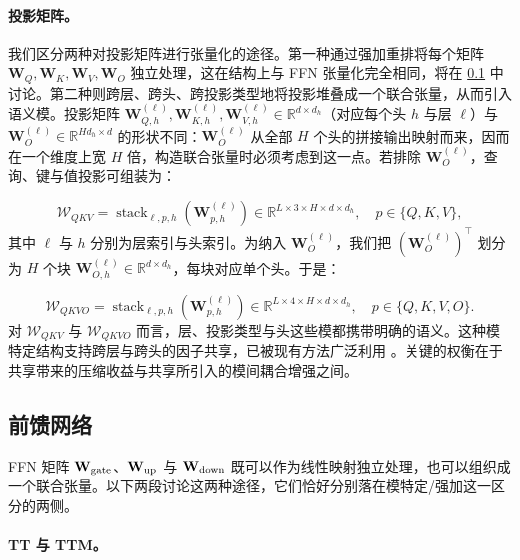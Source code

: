 \documentclass[11pt]{article}
\newcommand{\R}{\mathbb{R}}
\newcommand{\ten}[1]{\mathcal{#1}}
\newcommand{\mat}[1]{\mathbf{#1}}
\begin{document}
\paragraph{投影矩阵。}
我们区分两种对投影矩阵进行张量化的途径。第一种通过强加重排将每个矩阵 $\mat{W}_Q, \mat{W}_K, \mat{W}_V, \mat{W}_O$ 独立处理，这在结构上与 FFN 张量化完全相同，将在 \cref{sec:component-ffn} 中讨论。第二种则跨层、跨头、跨投影类型地将投影堆叠成一个联合张量，从而引入语义模。投影矩阵 $\mat{W}_{Q, h}^{(\ell)}, \mat{W}_{K, h}^{(\ell)}, \mat{W}_{V, h}^{(\ell)} \in\R^{d\times d_h}$（对应每个头 $h$ 与层 $\ell$）与 $\mat{W}_{O}^{(\ell)} \in\R^{Hd_h\times d}$ 的形状不同：$\mat{W}_{O}^{(\ell)}$ 从全部 $H$ 个头的拼接输出映射而来，因而在一个维度上宽 $H$ 倍，构造联合张量时必须考虑到这一点。若排除 $\mat{W}_{O}^{(\ell)}$，查询、键与值投影可组装为：

\begin{equation}
\label{eq:WQKV}
\ten{W}_{QKV} = \operatorname{stack}_{\ell,p,h}\!\left(\mat{W}_{p,h}^{(\ell)}\right) \in\R^{L\times 3\times H\times d\times d_h},
\quad p\in\{Q,K,V\},
\end{equation}
其中 $\ell$ 与 $h$ 分别为层索引与头索引。为纳入 $\mat{W}_{O}^{(\ell)}$，我们把 $(\mat{W}_{O}^{(\ell)})^\top$ 划分为 $H$ 个块 $\mat{W}_{O,h}^{(\ell)} \in\R^{d\times d_h}$，每块对应单个头。于是：

\begin{equation}
\label{eq:QKVO}
\ten{W}_{QKVO} = \operatorname{stack}_{\ell,p,h}\!\left(\mat{W}_{p,h}^{(\ell)}\right) \in\R^{L\times 4 \times H \times d \times d_h},
\quad p\in\{Q,K,V,O\}.
\end{equation}
对 $\ten{W}_{QKV}$ 与 $\ten{W}_{QKVO}$ 而言，层、投影类型与头这些模都携带明确的语义。这种模特定结构支持跨层与跨头的因子共享，已被现有方法广泛利用 \cite{li2026lestd}。关键的权衡在于共享带来的压缩收益与共享所引入的模间耦合增强之间。

\subsection{前馈网络}
\label{sec:component-ffn}

FFN 矩阵 $\mat{W}_{\rm gate}$、$\mat{W}_{\rm up}$ 与 $\mat{W}_{\rm down}$ 既可以作为线性映射独立处理，也可以组织成一个联合张量。以下两段讨论这两种途径，它们恰好分别落在模特定/强加这一区分的两侧。


\paragraph{TT 与 TTM。}
\end{document}
